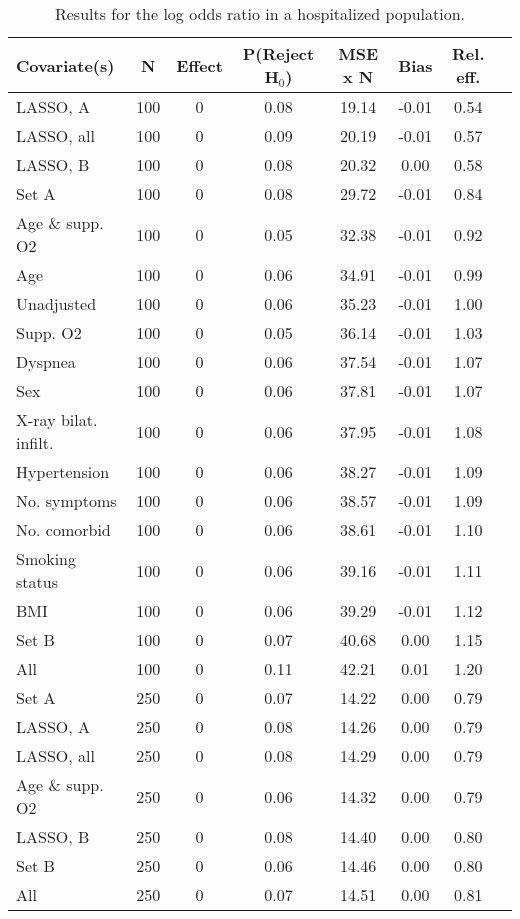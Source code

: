 \documentclass{article}
\begin{document}
{\tabcolsep=6pt  %
\begin{longtable}{lccccccc}
\caption{Results for the log odds ratio in a hospitalized population.}\label{tab13}\\
Covariate(s) & N & Effect & P(Reject H$_0$) & MSE x N & Bias & Rel. eff.\\ \midrule
LASSO, A & 100 & 0 & 0.08 & 19.14 & -0.01 & 0.54\\
LASSO, all & 100 & 0 & 0.09 & 20.19 & -0.01 & 0.57\\
LASSO, B & 100 & 0 & 0.08 & 20.32 & 0.00 & 0.58\\
Set A & 100 & 0 & 0.08 & 29.72 & -0.01 & 0.84\\
Age \& supp. O2 & 100 & 0 & 0.05 & 32.38 & -0.01 & 0.92\\
Age & 100 & 0 & 0.06 & 34.91 & -0.01 & 0.99\\
Unadjusted & 100 & 0 & 0.06 & 35.23 & -0.01 & 1.00\\
Supp. O2 & 100 & 0 & 0.05 & 36.14 & -0.01 & 1.03\\
Dyspnea & 100 & 0 & 0.06 & 37.54 & -0.01 & 1.07\\
Sex & 100 & 0 & 0.06 & 37.81 & -0.01 & 1.07\\
X-ray bilat. infilt. & 100 & 0 & 0.06 & 37.95 & -0.01 & 1.08\\
Hypertension & 100 & 0 & 0.06 & 38.27 & -0.01 & 1.09\\
No. symptoms & 100 & 0 & 0.06 & 38.57 & -0.01 & 1.09\\
No. comorbid & 100 & 0 & 0.06 & 38.61 & -0.01 & 1.10\\
Smoking status & 100 & 0 & 0.06 & 39.16 & -0.01 & 1.11\\
BMI & 100 & 0 & 0.06 & 39.29 & -0.01 & 1.12\\
Set B & 100 & 0 & 0.07 & 40.68 & 0.00 & 1.15\\
All & 100 & 0 & 0.11 & 42.21 & 0.01 & 1.20\\ \midrule
Set A & 250 & 0 & 0.07 & 14.22 & 0.00 & 0.79\\
LASSO, A & 250 & 0 & 0.08 & 14.26 & 0.00 & 0.79\\
LASSO, all & 250 & 0 & 0.08 & 14.29 & 0.00 & 0.79\\
Age \& supp. O2 & 250 & 0 & 0.06 & 14.32 & 0.00 & 0.79\\
LASSO, B & 250 & 0 & 0.08 & 14.40 & 0.00 & 0.80\\
Set B & 250 & 0 & 0.06 & 14.46 & 0.00 & 0.80\\
All & 250 & 0 & 0.07 & 14.51 & 0.00 & 0.81\\

\end{longtable}}
\end{document}
